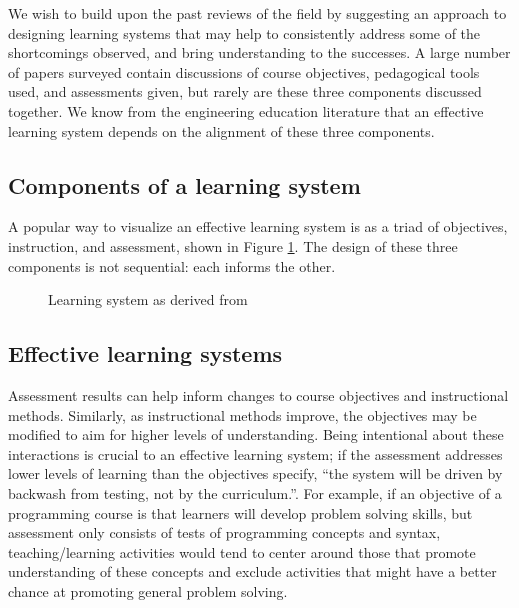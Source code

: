 \documentclass[12pt]{article}
\begin{document}
We wish to build upon the past reviews of the field by suggesting an
approach to designing learning systems that may help to consistently
address some of the shortcomings observed, and bring understanding to
the successes. A large number of papers surveyed contain discussions
of course objectives, pedagogical tools used, and assessments given,
but rarely are these three components discussed together. We know from
the engineering education literature that an effective learning system
depends on the alignment of these three
components\autocite{jamieson_creating_2009,pellegrino_rethinking_2006}.

\subsection{Components of a learning
system}\label{sec:components-of-a-learning-system}
A popular way to visualize an effective learning system is as a triad
of objectives, instruction, and
assessment\autocite{felder_designing_2003}, shown in Figure
\ref{fig:learning-system}. The design of these three components is not
sequential: each informs the other.

\begin{figure}[h!]
  \centering
  \caption{Learning system as derived from
    \citeauthor{felder_designing_2003}\autocite{felder_designing_2003}}
  \label{fig:learning-system}
\end{figure}

\subsection{Effective learning systems}\label{sec:effective-learning-systems}

Assessment results can help inform changes to course objectives and
instructional methods\autocite{felder_designing_2003}. Similarly, as
instructional methods improve, the objectives may be modified to aim
for higher levels of understanding. Being intentional about these
interactions is crucial to an effective learning system; if the
assessment addresses lower levels of learning than the objectives
specify, ``the system will be driven by backwash from testing, not by
the curriculum.''\autocite[][p. 350]{biggs_enhancing_1996}. For
example, if an objective of a programming course is that learners will
develop problem solving skills, but assessment only consists of tests
of programming concepts and syntax, teaching/learning activities would
tend to center around those that promote understanding of these
concepts and exclude activities that might have a better chance at
promoting general problem solving\autocite{biggs_enhancing_1996}.
\end{document}
